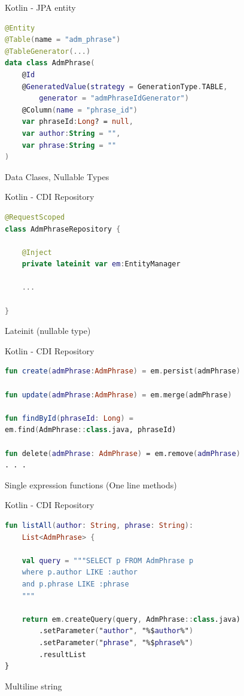 \documentclass[aspectratio=169]{beamer}
\begin{document}
\begin{frame}[fragile]{Kotlin - JPA entity}
\begin{lstlisting}[language=Kotlin]
@Entity
@Table(name = "adm_phrase")
@TableGenerator(...)
data class AdmPhrase(
	@Id
	@GeneratedValue(strategy = GenerationType.TABLE,
		generator = "admPhraseIdGenerator")
	@Column(name = "phrase_id")
	var phraseId:Long? = null,
	var author:String = "",
	var phrase:String = ""
)
\end{lstlisting}
Data Clases, Nullable Types
\end{frame}

\begin{frame}[fragile]{Kotlin - CDI Repository}
\begin{lstlisting}[language=Kotlin]
@RequestScoped
class AdmPhraseRepository {

	@Inject
	private lateinit var em:EntityManager

	...

}
\end{lstlisting}
Lateinit (nullable type)
\end{frame}

\begin{frame}[fragile]{Kotlin - CDI Repository}
\begin{lstlisting}[language=Kotlin]
fun create(admPhrase:AdmPhrase) = em.persist(admPhrase)

fun update(admPhrase:AdmPhrase) = em.merge(admPhrase)

fun findById(phraseId: Long) =
em.find(AdmPhrase::class.java, phraseId)

fun delete(admPhrase: AdmPhrase) = em.remove(admPhrase)
. . .
\end{lstlisting}
Single expression functions (One line methods)
\end{frame}

\begin{frame}[fragile]{Kotlin - CDI Repository}
\begin{lstlisting}[language=Kotlin]
fun listAll(author: String, phrase: String):
	List<AdmPhrase> {

	val query = """SELECT p FROM AdmPhrase p
	where p.author LIKE :author
	and p.phrase LIKE :phrase
	"""

	return em.createQuery(query, AdmPhrase::class.java)
		.setParameter("author", "%$author%")
		.setParameter("phrase", "%$phrase%")
		.resultList
}
\end{lstlisting}
Multiline string
\end{frame}
\end{document}
